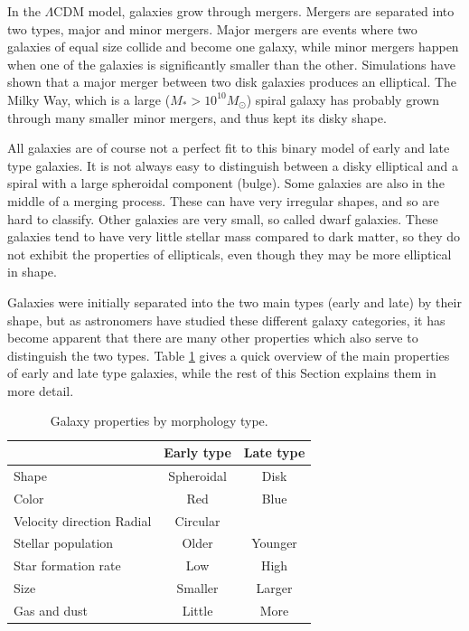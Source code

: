 In the $\Lambda$CDM model, galaxies grow through mergers. Mergers are separated into two types, major and minor mergers. Major mergers are events where two galaxies of equal size collide and become one galaxy, while minor mergers happen when one of the galaxies is significantly smaller than the other. Simulations have shown that a major merger between two disk galaxies produces an elliptical. The Milky Way, which is a large ($M_*>10^{10} M_\odot$) spiral galaxy has probably grown through many smaller minor mergers, and thus kept its disky shape.

All galaxies are of course not a perfect fit to this binary model of early and late type galaxies. It is not always easy to distinguish between a disky elliptical and a spiral with a large spheroidal component (bulge). Some galaxies are also in the middle of a merging process. These can have very irregular shapes, and so are hard to classify. Other galaxies are very small, so called dwarf galaxies. These galaxies tend to have very little stellar mass compared to dark matter, so they do not exhibit the properties of ellipticals, even though they may be more elliptical in shape.

Galaxies were initially separated into the two main types (early and late) by their shape, but as astronomers have studied these different galaxy categories, it has become apparent that there are many other properties which also serve to distinguish the two types. Table \ref{morphologies} gives a quick overview of the main properties of early and late type galaxies, while the rest of this Section explains them in more detail.


\begin{table}
\begin{center}
\caption{Galaxy properties by morphology type.}
\label{morphologies}
\begin{tabular} { l| c c } 
 \hline
 \hline
  & Early type & Late type \\
 \hline
 Shape & Spheroidal & Disk \\
 Color & Red & Blue \\
 Velocity direction Radial & Circular \\
 Stellar population & Older & Younger \\
 Star formation rate & Low & High \\
 Size & Smaller & Larger \\
 Gas and dust & Little & More \\
  
 \hline 
\end{tabular}
\end{center}
\end{table}


